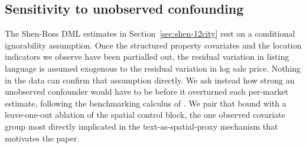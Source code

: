 
\subsection{Sensitivity to unobserved confounding}
\label{sec:sensitivity-12}

The Shen-Ross DML estimates in Section~\ref{sec:shen-12city} rest on a conditional ignorability assumption. Once the structured property covariates and the location indicators we observe have been partialled out, the residual variation in listing language is assumed exogenous to the residual variation in log sale price. Nothing in the data can confirm that assumption directly. We ask instead how strong an unobserved confounder would have to be before it overturned each per-market estimate, following the benchmarking calculus of \citet{cinelli2020making}. We pair that bound with a leave-one-out ablation of the spatial control block, the one observed covariate group most directly implicated in the text-as-spatial-proxy mechanism that motivates the paper.

